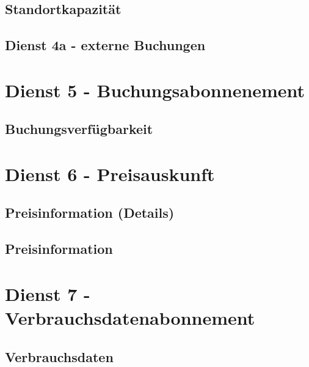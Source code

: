 \subsection*{Standortkapazität}



\subsection*{Dienst 4a - externe Buchungen}
\label{sec:Datenmodell:Dienst4a}



\section{Dienst 5 - Buchungsabonnenement}
\label{sec:Datenmodell:Dienst5}

\subsection*{Buchungsverfügbarkeit}



\section{Dienst 6 - Preisauskunft}
\label{sec:Datenmodell:Dienst6}

\subsection*{Preisinformation (Details)}



\subsection*{Preisinformation}




\section{Dienst 7 - Verbrauchsdatenabonnement}
\label{sec:Datenmodell:Dienst7}

\subsection*{Verbrauchsdaten}




